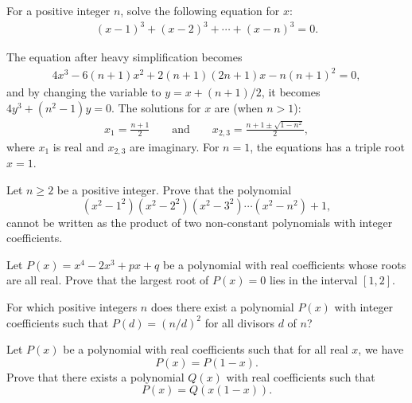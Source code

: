 \documentclass[12pt,a4paper]{memoir}
\theoremstyle{definition}
\begin{document}
\begin{question}
	For a positive integer $n$, solve the following equation for $x$:
	\begin{align*}
		(x-1)^3 + (x-2)^3 + \cdots + (x-n)^3 = 0.
	\end{align*}
\end{question}

\begin{solution}
	The equation after heavy simplification becomes
	\begin{align*}
		4x^3 - 6(n+1)x^2 + 2(n+1)(2n+1)x-n(n+1)^2=0,
	\end{align*}
	and by changing the variable to $y= x + (n+1)/2$, it becomes $4y^3 + (n^2-1)y=0$. The solutions for $x$ are (when $n>1$):
	\begin{align*}
		x_1 = \frac{n+1}{2} \qquad \text{and} \qquad x_{2,3}=\frac{n+1\pm\sqrt{1-n^2}}{2},
	\end{align*}
	where $x_1$ is real and $x_{2,3}$ are imaginary. For $n=1$, the equations has a triple root $x=1$.
\end{solution}


\begin{question}[name={2005 Switzerland TST}]
	Let $n\geq 2$ be a positive integer. Prove that the polynomial
	\[(x^2-1^2)(x^2-2^2)(x^2-3^2)\cdots (x^2-n^2)+1,\]
	cannot be written as the product of two non-constant polynomials with integer coefficients.
\end{question}


\begin{question}[name={2008 Switzerland TST}]
	Let $P(x)=x^4-2x^3+px+q$ be a polynomial with real coefficients whose roots are all real. Prove that the largest root of $P(x)=0$ lies in the interval $[1,2]$.
\end{question}


\begin{question}[name={2009 Switzerland TST}]
	For which positive integers $n$ does there exist a polynomial $P(x)$ with integer coefficients such that $P(d)=(n/d)^2$ for all divisors $d$ of $n$?
\end{question}


\begin{question}[name={2010 Switzerland TST}]
	Let $P(x)$ be a polynomial with real coefficients such that for all real $x$, we have \[P(x)=P(1-x).\] Prove that there exists a polynomial $Q(x)$ with real coefficients such that \[P(x)=Q\left(x(1-x)\right).\]
\end{question}
\end{document}
